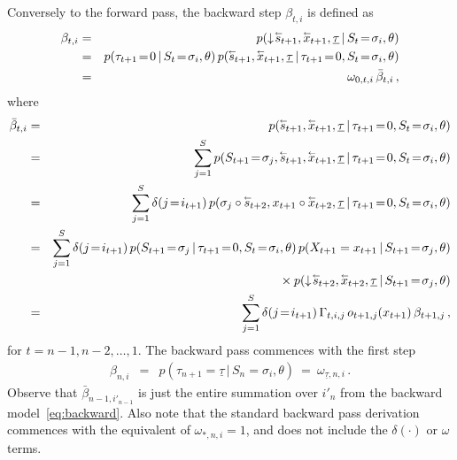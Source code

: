 \documentclass[a4paper]{article}
\newcommand{\rvec}[1]{\accentset{\leftarrow}{#1}}
\newcommand{\dn}{\downarrow\!}
\begin{document}
Conversely to the forward pass, the backward step $\beta_{t,i}$ is defined as
\begin{eqnarray}
   \beta_{t,i} & = & p(\dn\rvec{s}_{t+1},\rvec{x}_{t+1},\underline{\tau}\,|\,S_t\!=\!\sigma_{i},\theta) 
\nonumber\\& = &
  p(\tau_{t+1}\!=\!0\,|\,S_t\!=\!\sigma_i,\theta)\,p(\rvec{s}_{t+1},\rvec{x}_{t+1},\underline{\tau}\,|\,\tau_{t+1}\!=\!0,S_t\!=\!\sigma_{i},\theta) 
\nonumber\\& = &
  \omega_{0,t,i}\,\bar{\beta}_{t,i}\,,
\label{eq:beta}
\end{eqnarray}
where
\begin{eqnarray}
   \bar{\beta}_{t,i} & = & p(\rvec{s}_{t+1},\rvec{x}_{t+1},\underline{\tau}\,|\,\tau_{t+1}\!=\!0,S_t\!=\!\sigma_{i},\theta) 
\nonumber\\& = &
  \sum_{j=1}^{S} p(S_{t+1}\!=\!\sigma_j,\rvec{s}_{t+1},\rvec{x}_{t+1},\underline{\tau}\,|\,\tau_{t+1}\!=\!0,S_t\!=\!\sigma_{i},\theta) 
\nonumber\\& = &
  \sum_{j=1}^{S}\delta(j\!=\!i_{t+1})\, p(\sigma_j\circ\rvec{s}_{t+2},x_{t+1}\circ\rvec{x}_{t+2},\underline{\tau}\,|\,\tau_{t+1}\!=\!0,S_t\!=\!\sigma_{i},\theta) 
\nonumber\\& = & 
   \sum_{j=1}^{S}\delta(j\!=\!i_{t+1})\, p(S_{t+1}\!=\!\sigma_j\,|\,\tau_{t+1}\!=\!0,S_t\!=\!\sigma_i,\theta)
\,p(X_{t+1}=x_{t+1}\,|\,S_{t+1}\!=\!\sigma_j,\theta)
\nonumber\\&&\hspace*{5mm}{}\times
p(\dn\rvec{s}_{t+2},\rvec{x}_{t+2},\underline{\tau}\,|\,S_{t+1}\!=\!\sigma_{j},\theta) 
\nonumber\\& = & 
	\sum_{j=1}^{S}\delta(j\!=\!i_{t+1})\,\Gamma_{t,i,j}\,o_{t+1,j}(x_{t+1})\,\beta_{t+1,j}
\,,
\end{eqnarray}
for $t=n-1,n-2,\ldots,1$. The backward pass commences with the first step
\begin{eqnarray}
   \beta_{n,i} & = & p(\tau_{n+1}\!=\!\underline{\tau}\,|\,S_n\!=\!\sigma_i,\theta)
~=~\omega_{\underline{\tau},n,i}\,.
\label{eq:beta_n}
\end{eqnarray}
Observe that $\bar{\beta}_{n-1,i'_{n-1}}$ is just
the entire summation over $i'_n$ from the backward model~\eqref{eq:backward}.
Also note that the standard backward pass derivation commences with the equivalent of $\omega_{*,n,i}=1$,
and does not include the $\delta(\cdot)$ or $\omega$ terms.
\end{document}
